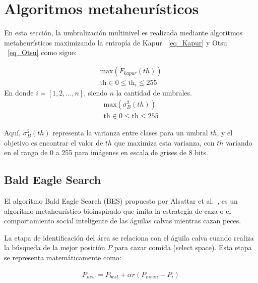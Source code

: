 \documentclass[conference]{IEEEtran}
\begin{document}
\section{Algoritmos metaheurísticos} \label{sec:ds}

\noindent En esta sección, la umbralización multinivel es realizada mediante algoritmos metaheurísticos maximizando la entropía de Kapur ~\ref{eq_Kapur} y Otsu ~\ref{eq_Otsu} como sigue:

\begin{equation}
	\begin{gathered}
		\text{max}(F_{kapur}(th)) \\
		\text{th} \in 0 \leq \text{th}_i \leq 255
	\end{gathered}
	\label{eq_Kapur}
\end{equation}
\noindent En donde $i=[1,2,...,n]$, siendo $n$ la cantidad de umbrales.
\begin{equation}
	\begin{gathered}
		\text{max}(\sigma_B^2(th)) \\
		\text{th} \in 0 \leq \text{th} \leq 255
	\end{gathered}
	\label{eq_Otsu}
\end{equation}

\noindent Aquí, $\sigma_B^2(th)$ representa la varianza entre clases para un umbral $th$, y el objetivo es encontrar el valor de $th$ que maximiza esta varianza, con $th$ variando en el rango de 0 a 255 para imágenes en escala de grises de 8 bits.

\subsection{Bald Eagle Search}

\noindent El algoritmo Bald Eagle Search (BES) propuesto por Alsattar et al.~\cite{Alsattar2019}, es un algoritmo metaheurístico bioinspirado que imita la estrategia de caza o el comportamiento social inteligente de las águilas calvas mientras cazan peces. 

\noindent La etapa de identificación del área se relaciona con el águila calva cuando realiza la búsqueda de la mejor posición $P$ para cazar comida (select space). Esta etapa se representa matemáticamente como:

\begin{equation}
	\begin{gathered}
		P_{new}=P_{best}+{\alpha}r(P_{mean}-P_{i})\\
	\end{gathered}
	\label{eq11}
\end{equation}
\end{document}
